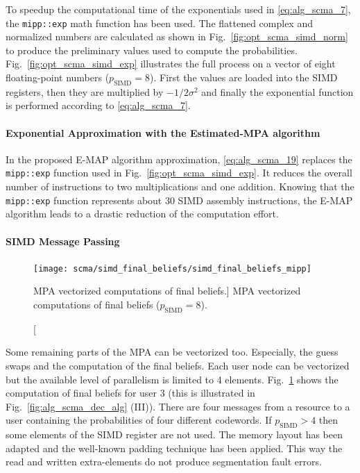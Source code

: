 To speedup the computational time of the exponentials used in
\eqref{eq:alg_scma_7}, the \verb|mipp::exp| math function has been used. The
flattened complex and normalized numbers are calculated as shown in
Fig.~\ref{fig:opt_scma_simd_norm} to produce the preliminary values used to
compute the probabilities. Fig.~\ref{fig:opt_scma_simd_exp} illustrates the full
process on a vector of eight floating-point numbers ($p_\text{SIMD} = 8$). First
the values are loaded into the SIMD registers, then they are multiplied by
$-1/2\sigma^2$ and finally the exponential function is performed according to
\eqref{eq:alg_scma_7}.

\paragraph{Exponential Approximation with the Estimated-MPA algorithm}

In the proposed E-MAP algorithm approximation, \eqref{eq:alg_scma_19} replaces
the \verb|mipp::exp| function used in Fig.~\ref{fig:opt_scma_simd_exp}. It
reduces the overall number of instructions to two multiplications and one
addition. Knowing that the \verb|mipp::exp| function represents about 30 SIMD
assembly instructions, the E-MAP algorithm leads to a drastic reduction of the
computation effort.

\paragraph{SIMD Message Passing}

\begin{figure}[htp]
  \centering
  \texttt{[image: scma/simd\_final\_beliefs/simd\_final\_beliefs\_mipp]}
  \caption
    [MPA vectorized computations of final beliefs.]
    {MPA vectorized computations of final beliefs ($p_\text{SIMD} = 8$).}
  \label{fig:opt_scma_simd_final_guess}
\end{figure}

Some remaining parts of the MPA can be vectorized too. Especially, the guess
swaps and the computation of the final beliefs. Each user node can be
vectorized but the available level of parallelism is limited to 4 elements.
Fig.~\ref{fig:opt_scma_simd_final_guess} shows the computation of final beliefs
for user 3 (this is illustrated in Fig.~\ref{fig:alg_scma_dec_alg} (III)).
There are four messages from a resource to a user containing the probabilities
of four different codewords. If $p_\text{SIMD} > 4$ then some elements of the
SIMD register are not used. The memory layout has been adapted and the
well-known padding technique has been applied. This way the read and written
extra-elements do not produce segmentation fault errors.

